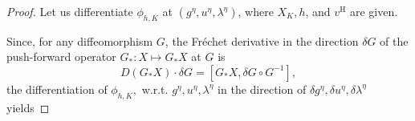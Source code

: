 \documentclass[oneside, 11pt]{amsbook}
\newcommand{\set}[1]{{\left\{#1\right\}}}
\newcommand{\pa}[1]{{\left(#1\right)}}
\newcommand{\T}{\mathbb{T}}
\newcommand{\teta}{\theta}
\newcommand{\uh}{u^{\text{H}}} %
\newcommand{\vh}{v^{\text{H}}} %
\newcommand{\push}[1]{#1_\ast}%
\newcommand{\gr}[1]{\textbf{#1}}%
\newcommand{\id}{\operatorname{id}}
\newcommand{\tf}{{\mathtt{f}}}
\newcommand{\0}{{(0)}}
\newcommand{\3}{{(3)}}
\newcommand{\hu}{u^\eta}
\newtheorem{rmk}{Remark}[section]
\numberwithin{equation}{section}
\numberwithin{defn}{section}
\numberwithin{prop}{section}
\numberwithin{cor}{section}
\numberwithin{lemma}{section}
\numberwithin{rmk}{section}
\numberwithin{corollary}{section}
\begin{document}
\begin{proof}
Let us differentiate $\phi_{h,K}$ at $(g^\eta,u^\eta,\lambda^\eta)$, where $X_{K}, h$, and $\vh$ are given. 
\medskip



%

Since,  for any diffeomorphism $G$, the Fr\'echet derivative in the direction $\delta G$ of the push-forward operator $\push{G}: X\mapsto \push{G}X$ at $G$ is $$D(\push{G}X)\cdot\delta G = [\push{G}X, \delta G\circ G^{-1}],$$  the differentiation of $\phi_{h,K},$ w.r.t.  $ g^\eta,  u^\eta, \lambda^\eta$ in the direction of $\delta g^\eta, \delta u^\eta, \delta \lambda^\eta$ yields

%
%
%


%


\end{proof}
\end{document}
